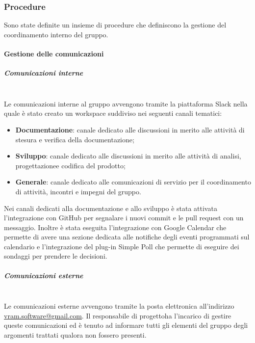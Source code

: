 		\subsubsection{Procedure}
		Sono state definite un insieme di procedure che definiscono la gestione del coordinamento interno del gruppo.
		\paragraph{Gestione delle comunicazioni}
			\subparagraph{Comunicazioni interne}\mbox{}\\ [1mm]
				Le comunicazioni interne al gruppo avvengono tramite la piattaforma Slack nella quale è stato creato un workspace suddiviso nei seguenti canali tematici:
				\begin{itemize}
					\item \textbf{Documentazione}: canale dedicato alle discussioni in merito alle attività di stesura e verifica della documentazione;
					\item \textbf{Sviluppo}: canale dedicato alle discussioni in merito alle attività di analisi, progettazione\glosp e codifica del prodotto\glo;
					\item \textbf{Generale}: canale dedicato alle comunicazioni di servizio per il coordinamento di attività, incontri e impegni del gruppo.
				\end{itemize}
				Nei canali dedicati alla documentazione e allo sviluppo è stata attivata l'integrazione con GitHub per segnalare i nuovi commit e le pull request con un messaggio.
				Inoltre è stata eseguita l'integrazione con Google Calendar che permette di avere una sezione dedicata alle notifiche degli eventi programmati sul calendario e l'integrazione del plug-in Simple Poll che permette di eseguire dei sondaggi per prendere le decisioni.
			\subparagraph{Comunicazioni esterne}\mbox{}\\ [1mm]
				Le comunicazioni esterne avvengono tramite la posta elettronica all'indirizzo \url{vram.software@gmail.com}.
				Il responsabile di progetto\glosp ha l'incarico di gestire queste comunicazioni ed è tenuto ad informare tutti gli elementi del gruppo degli argomenti trattati qualora non fossero presenti.
